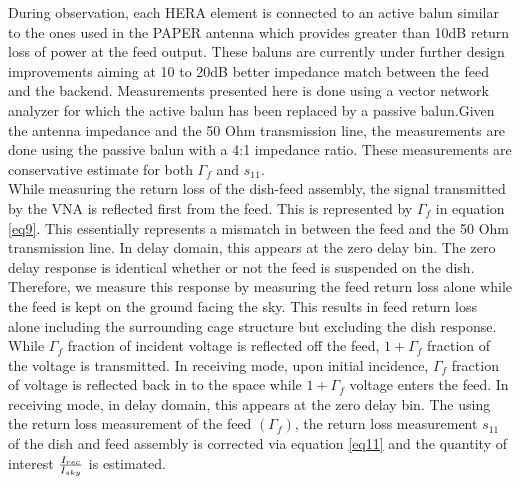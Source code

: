 \documentclass[twocolumn]{emulateapj}
\begin{document}
    
    During observation, each HERA element is connected to an active balun similar
    to the ones used in the PAPER antenna which provides greater than 10dB return
    loss of power at the feed output. These baluns are currently under further design 
    improvements aiming at 10 to 20dB
    better impedance match between the feed and the backend.
    Measurements presented here is done using a vector network analyzer for
    which the active balun has been replaced by a passive balun.Given the antenna
    impedance and the 50 Ohm transmission line, the measurements are done using the
    passive balun with a 4:1 impedance ratio. These measurements are conservative
    estimate  for both $\Gamma_{f}$ and $s_{11}$.\\ While measuring the return loss
    of the dish-feed assembly, the signal transmitted by the VNA is reflected first
    from the feed. This is represented by $\Gamma_{f}$ in equation \ref{eq9}. This
    essentially represents a mismatch in between the feed and the 50 Ohm
    transmission line. In delay domain, this appears at the zero delay bin. The
    zero delay response is identical whether or not the feed is suspended on the
    dish. Therefore, we measure this response by measuring the feed return loss
    alone while the feed is kept on the ground facing the sky. This results in feed
    return loss alone including the surrounding cage structure but excluding the
    dish response. While $\Gamma_{f}$ fraction of incident voltage is reflected off
    the feed, $1+\Gamma_{f}$ fraction of the voltage is transmitted. In receiving
    mode, upon initial incidence, $\Gamma_{f}$ fraction of voltage is reflected
    back in to the space while $1+\Gamma_{f}$ voltage enters the feed. In receiving
    mode, in delay domain, this appears at the zero delay bin.  The using the
    return loss measurement of the feed $(\Gamma_{f})$, the return loss measurement
    $s_{11}$ of the dish and feed assembly is corrected via equation \ref{eq11} and
    the quantity of interest ${I_{rec}\over I_{sky}}$ is estimated. 
    
\end{document}

